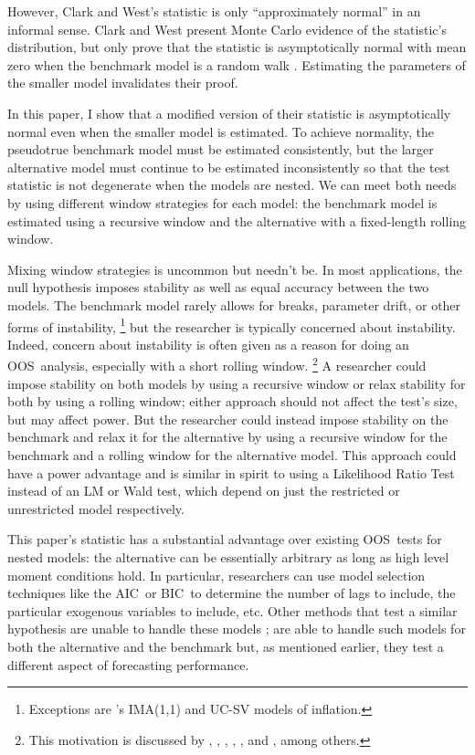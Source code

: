 \documentclass[12pt,fleqn]{article}
\newcommand\citepos[2][]{\citeauthor{#2}'s \citeyearpar[#1]{#2}}
\theoremstyle{definition}
\newcommand{\aic}{AIC}
\newcommand{\bic}{BIC}
\newcommand{\oos}{OOS}
\begin{document}
However, Clark and West's statistic is only ``approximately normal''
in an informal sense.  Clark and West present Monte Carlo evidence of
the statistic's distribution, but only prove that the statistic is
asymptotically normal with mean zero when the benchmark model is a
random walk \citep{ClW:06}. Estimating the parameters of the smaller
model invalidates their proof.

In this paper, I show that a modified version of their statistic is
asymptotically normal even when the smaller model is estimated.  To
achieve normality, the pseudotrue benchmark model must be estimated
consistently, but the larger alternative model must continue to be
estimated inconsistently so that the test statistic is not degenerate
when the models are nested. We can meet both needs by
using different window strategies for each model: the benchmark model
is estimated using a recursive window and the alternative with a
fixed-length rolling window.

Mixing window strategies is uncommon but needn't be. In most
applications, the null hypothesis imposes stability as well as equal
accuracy between the two models.  The benchmark model rarely allows
for breaks, parameter drift, or other forms of
instability,%
\footnote{Exceptions are \citepos{StW:07}
  IMA(1,1) and UC-SV models of inflation.} %
but the
researcher is typically concerned about instability.  Indeed, concern
about instability is often given as a reason for doing an \oos\
analysis, especially with a short rolling window.%
\footnote{This
  motivation is discussed by \citet{StW:03}, \citet{PeT:05,PeT:07},
  \cite{GiW:06}, \citet{GoW:08}, \citet{ClM:09c}, and
  \cite{GiR:09,GiR:10}, among others.} %
A researcher could impose
stability on both models by using a recursive window or relax
stability for both by using a rolling window; either approach should
not affect the test's size, but may affect power.  But the researcher
could instead impose stability on the benchmark and relax it for the
alternative by using a recursive window for the benchmark and a
rolling window for the alternative model.  This approach could have a
power advantage and is similar in spirit to using a Likelihood Ratio
Test instead of an LM or Wald test, which depend on just the
restricted or unrestricted model respectively.

This paper's statistic has a substantial advantage over existing \oos\
tests for nested models: the alternative can be essentially arbitrary
as long as high level moment conditions hold.  In particular,
researchers can use model selection techniques like the \aic\ or \bic\
to determine the number of lags to include, the particular exogenous
variables to include, etc.  Other methods that test a similar
hypothesis are unable to handle these models \citep[except][which does
not allow the benchmark to be estimated]{ClW:06}; \citet{GiW:06} are
able to handle such models for both the alternative and the benchmark
but, as mentioned earlier, they test a different aspect of forecasting
performance.
\end{document}
